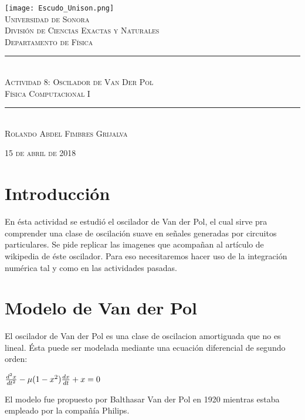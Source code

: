 \documentclass{article}
\newcommand{\HRule}{\rule{\linewidth}{0.5mm}}
\begin{document}
\begin{center}

\texttt{[image: Escudo\_Unison.png]}~\\[1cm]

\textsc{\LARGE Universidad de Sonora}\\[0.1cm]
\textsc{División de Ciencias Exactas y Naturales}\\[0.1cm]
\textsc{Departamento de Física}\\[1.5cm]

\HRule \\[0.4cm]
\textsc{Actividad 8: Oscilador de Van Der Pol}\\[0.1cm]
\textsc{Física Computacional I \\[0.1cm]}
\HRule \\[1.5cm]

\textsc{Rolando Abdel Fimbres Grijalva \\[1.0cm]}

\vfill
\textsc{15 de abril de 2018\\[0.1cm]}
\end{center}
\newpage
{}
\section{Introducción}
En ésta actividad se estudió el oscilador de Van der Pol, el cual sirve pra comprender una clase de oscilación suave en señales generadas por circuitos particulares. Se pide replicar las imagenes que acompañan al artículo de wikipedia de éste oscilador. Para eso necesitaremos hacer uso de la integración numérica tal y como en las actividades pasadas.\\
\section{Modelo de Van der Pol}
El oscilador de Van der Pol es una clase de oscilacion amortiguada que no es lineal. Ésta puede ser modelada mediante una ecuación diferencial de segundo orden:\\
\begin{center}
${d^{2}x \over dt^{2}}-\mu(1-x^{2}){dx \over dt}+x=0$
\end{center}
El modelo fue propuesto por Balthasar Van der Pol en 1920 mientras estaba empleado por la compañía Philips.\\
\end{document}
